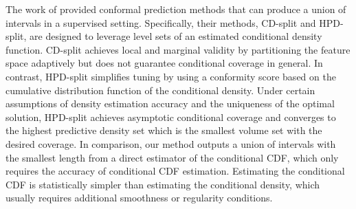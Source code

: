 The work of \citet{izbicki2020flexible,izbicki2022cd} provided conformal prediction methods that can produce a union of intervals in a supervised setting. Specifically, their methods, CD-split and HPD-split, are designed to leverage level sets of an estimated conditional density function. CD-split achieves local and marginal validity by partitioning the feature space adaptively but does not guarantee conditional coverage in general. 
In contrast, HPD-split simplifies tuning by using a conformity score based on the cumulative distribution function of the conditional density. Under certain assumptions of density estimation accuracy and the uniqueness of the optimal solution, HPD-split achieves asymptotic conditional coverage and converges to the highest predictive density
set which is the smallest volume set with the desired coverage.
In comparison, our method outputs a union of intervals with the smallest length from a direct estimator of the conditional CDF, which only requires the accuracy of conditional CDF estimation. Estimating the conditional CDF is statistically simpler than estimating the conditional density, which usually requires additional smoothness or regularity conditions.


